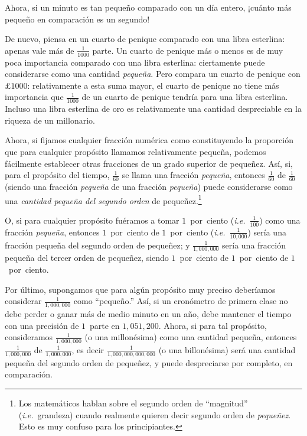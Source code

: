 \documentclass[12pt]{book}[2005/09/16]
\newcommand{\DPPageSep}[2]{\Pagelabel{#2}}
\newcommand{\Pagelabel}[1]
  {\phantomsection\label{#1}}
\newcommand{\IE}{\textit{i.e.}}
\begin{document}
Ahora, si un minuto es tan pequeño comparado con un
día entero, ¡cuánto más pequeño en comparación es un
segundo!

De nuevo, piensa en un cuarto de penique comparado con una
libra esterlina: apenas vale más de $\frac{1}{1000}$ parte.
Un cuarto de penique más o menos es de muy poca importancia
comparado con una libra esterlina: ciertamente puede considerarse
como una cantidad \emph{pequeña}. Pero compara un cuarto de penique
con £$1000$: relativamente a esta suma mayor, el
cuarto de penique no tiene más importancia que $\frac{1}{1000}$ de un
cuarto de penique tendría para una libra esterlina. Incluso una libra
esterlina de oro es relativamente una cantidad despreciable en la
riqueza de un millonario.

Ahora, si fijamos cualquier fracción numérica como
constituyendo la proporción que para cualquier propósito
llamamos relativamente pequeña, podemos fácilmente establecer otras
fracciones de un grado superior de pequeñez. Así, si,
para el propósito del tiempo, $\frac{1}{60}$ se llama una fracción \emph{pequeña},
entonces $\frac{1}{60}$ de $\frac{1}{60}$ (siendo una fracción \emph{pequeña} de una fracción
\emph{pequeña}) puede considerarse como una \emph{cantidad pequeña del
segundo orden}\Pagelabel{smallness} de pequeñez.\footnote
  {Los matemáticos hablan sobre el segundo orden de ``magnitud''
  (\IE~grandeza) cuando realmente quieren decir segundo orden de \emph{pequeñez}.
  Esto es muy confuso para los principiantes.}

O, si para cualquier propósito fuéramos a tomar $1$~por~ciento
(\IE~$\frac{1}{100}$) como una fracción \emph{pequeña}, entonces $1$~por~ciento de
$1$~por~ciento (\IE~$\frac{1}{10,000}$) sería una fracción pequeña
del segundo orden de pequeñez; y $\frac{1}{1,000,000}$ sería
\DPPageSep{017.png}{5}%
una fracción pequeña del tercer orden de pequeñez,
siendo $1$~por~ciento de $1$~por~ciento de $1$~por~ciento.

Por último, supongamos que para algún propósito muy preciso
deberíamos considerar $\frac{1}{1,000,000}$ como ``pequeño.'' Así, si un
cronómetro de primera clase no debe perder o ganar más de
medio minuto en un año, debe mantener el tiempo con una
precisión de $1$~parte en $1,051,200$. Ahora, si para tal
propósito, consideramos $\frac{1}{1,000,000}$ (o una millonésima) como una
cantidad pequeña, entonces $\frac{1}{1,000,000}$ de $\frac{1}{1,000,000}$, es decir
$\frac{1}{1,000,000,000,000}$ (o una billonésima) será una cantidad pequeña
del segundo orden de pequeñez, y puede
despreciarse por completo, en comparación.
\end{document}
